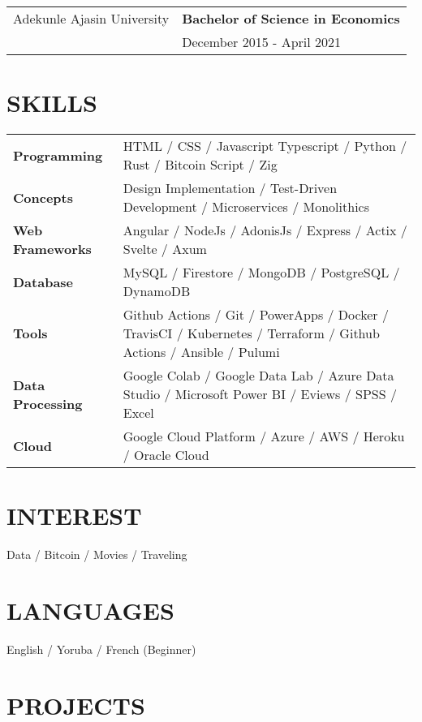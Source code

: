 \documentclass[a4paper,12pt]{article}
\begin{document}
\begin{tabularx}{\linewidth}{@{}l X@{}}
Adekunle Ajasin University & \textbf{Bachelor of Science in Economics} \\
                          & December 2015 - April 2021 \\[10pt]
\end{tabularx}

\section{SKILLS}

\begin{tabularx}{\linewidth}{@{}l X@{}}
\textbf{Programming} & HTML / CSS / Javascript Typescript / Python / Rust / Bitcoin Script / Zig \\
\textbf{Concepts} & Design Implementation / Test-Driven Development / Microservices / Monolithics \\
\textbf{Web Frameworks} & Angular / NodeJs / AdonisJs / Express / Actix / Svelte / Axum \\
\textbf{Database} & MySQL / Firestore / MongoDB / PostgreSQL / DynamoDB \\
\textbf{Tools} & Github Actions / Git / PowerApps / Docker / TravisCI / Kubernetes / Terraform / Github Actions / Ansible / Pulumi  \\
\textbf{Data Processing} & Google Colab / Google Data Lab / Azure Data Studio / Microsoft Power BI / Eviews / SPSS / Excel \\
\textbf{Cloud} & Google Cloud Platform / Azure / AWS / Heroku / Oracle Cloud
\end{tabularx}

\section{INTEREST}
Data / Bitcoin / Movies / Traveling

\section{LANGUAGES}
English / Yoruba / French (Beginner)

\section{PROJECTS}
\end{document}
